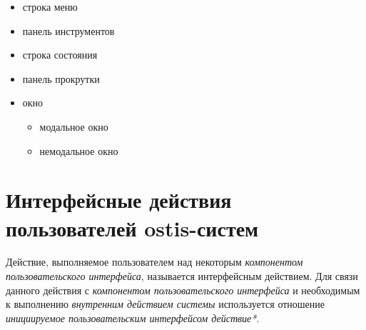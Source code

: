 \begin{itemize}
\begin{itemize}
\begin{itemize}
			\item строка меню
			\item панель инструментов
			\item строка состояния
			\item панель прокрутки
			\item окно
			\begin{itemize}
				\item модальное окно
				\item немодальное окно
			\end{itemize}
		\end{itemize}
	\end{itemize}
\end{itemize}


\section{Интерфейсные действия пользователей ostis-систем}


Действие, выполняемое пользователем над некоторым \textit{компонентом пользовательского интерфейса}, называется интерфейсным действием. Для связи данного действия с \textit{компонентом пользовательского интерфейса} и необходимым к выполнению \textit{внутренним действием системы} используется отношение \textit{инициируемое пользовательским интерфейсом действие*}.


